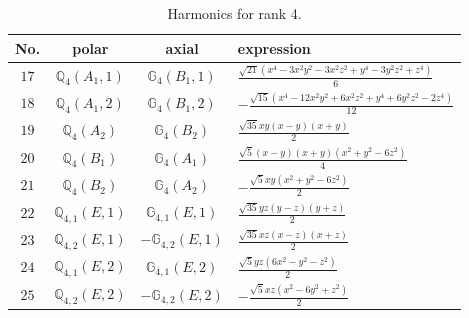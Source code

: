 \documentclass[fleqn,8pt,landscape]{jsarticle}
\begin{document}
\begin{table}[ht!]
\begin{center}
\caption{Harmonics for rank 4.}
\renewcommand{\arraystretch}{1.3}
\begin{tabular}{cccl} \hline \hline
No. & polar & axial & expression \\ \hline
$ 17 $ & $ \mathbb{Q}_{4}(A_{1},1) $ & $ \mathbb{G}_{4}(B_{1},1) $ & $ \frac{\sqrt{21} \left(x^{4} - 3 x^{2} y^{2} - 3 x^{2} z^{2} + y^{4} - 3 y^{2} z^{2} + z^{4}\right)}{6} $ \\
$ 18 $ & $ \mathbb{Q}_{4}(A_{1},2) $ & $ \mathbb{G}_{4}(B_{1},2) $ & $ - \frac{\sqrt{15} \left(x^{4} - 12 x^{2} y^{2} + 6 x^{2} z^{2} + y^{4} + 6 y^{2} z^{2} - 2 z^{4}\right)}{12} $ \\
$ 19 $ & $ \mathbb{Q}_{4}(A_{2}) $ & $ \mathbb{G}_{4}(B_{2}) $ & $ \frac{\sqrt{35} x y \left(x - y\right) \left(x + y\right)}{2} $ \\
$ 20 $ & $ \mathbb{Q}_{4}(B_{1}) $ & $ \mathbb{G}_{4}(A_{1}) $ & $ \frac{\sqrt{5} \left(x - y\right) \left(x + y\right) \left(x^{2} + y^{2} - 6 z^{2}\right)}{4} $ \\
$ 21 $ & $ \mathbb{Q}_{4}(B_{2}) $ & $ \mathbb{G}_{4}(A_{2}) $ & $ - \frac{\sqrt{5} x y \left(x^{2} + y^{2} - 6 z^{2}\right)}{2} $ \\
$ 22 $ & $ \mathbb{Q}_{4,1}(E,1) $ & $ \mathbb{G}_{4,1}(E,1) $ & $ \frac{\sqrt{35} y z \left(y - z\right) \left(y + z\right)}{2} $ \\
$ 23 $ & $ \mathbb{Q}_{4,2}(E,1) $ & $ -\mathbb{G}_{4,2}(E,1) $ & $ \frac{\sqrt{35} x z \left(x - z\right) \left(x + z\right)}{2} $ \\
$ 24 $ & $ \mathbb{Q}_{4,1}(E,2) $ & $ \mathbb{G}_{4,1}(E,2) $ & $ \frac{\sqrt{5} y z \left(6 x^{2} - y^{2} - z^{2}\right)}{2} $ \\
$ 25 $ & $ \mathbb{Q}_{4,2}(E,2) $ & $ -\mathbb{G}_{4,2}(E,2) $ & $ - \frac{\sqrt{5} x z \left(x^{2} - 6 y^{2} + z^{2}\right)}{2} $ \\
 \hline \hline
\end{tabular}
\end{center}
\end{table}
\end{document}

